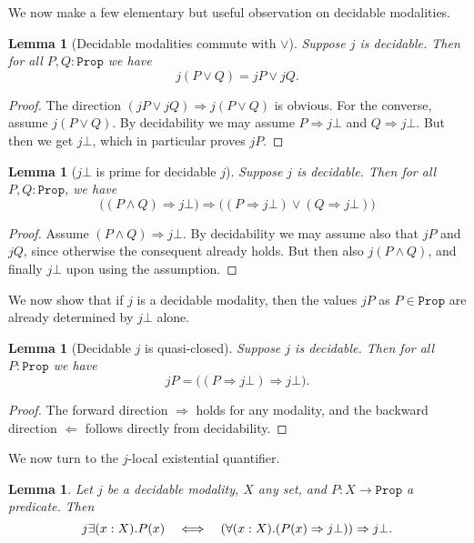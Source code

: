 \documentclass[reqno,11pt]{amsproc}
\theoremstyle{plain}
\newtheorem{lemma}[theorem]{Lemma}
\theoremstyle{definition}
\newcommand{\Const}[1]{\mathtt{#1}}
\renewcommand{\to}[1][]{\xrightarrow{#1}}
\newcommand{\prop}{\Const{Prop}}
\newcommand{\imp}{\Rightarrow}
\let\originalleft\left
\let\originalright\right
\renewcommand{\left}{\mathopen{}\mathclose\bgroup\originalleft}
\renewcommand{\right}{\aftergroup\egroup\originalright}
\numberwithin{equation}{section}
\begin{document}
We now make a few elementary but useful observation on decidable modalities.

\begin{lemma}[Decidable modalities commute with $\lor$]
	\label{prop.dec_mod_or}
	Suppose $j$ is decidable. Then for all $P,Q:\prop$ we have
	\[
		j (P \lor Q) = j P \lor j Q.
	\]
\end{lemma}

\begin{proof}
	The direction $(j P \lor j Q)\imp j (P \lor Q)$ is obvious. For the converse, assume $j (P \lor Q)$. By decidability we may assume $P\imp j \bot$ and $Q\imp j \bot$. But then we get $j \bot$, which in particular proves $j P$.
\end{proof}

\begin{lemma}[$j \bot$ is prime for decidable $j$]
Suppose $j$ is decidable. Then for all $P,Q:\prop$, we have
\[\big((P\wedge Q)\imp j \bot\big)\imp\big((P\imp j \bot)\lor(Q\imp j \bot)\big)\]
\end{lemma}

\begin{proof}
Assume $(P\wedge Q)\imp j \bot$. By decidability we may assume also that $j P$ and $j Q$, since otherwise the consequent already holds. But then also $j (P\wedge Q)$, and finally $j \bot$ upon using the assumption.
\end{proof}

We now show that if $j$ is a decidable modality, then the values $jP$ as $P \in \prop$ are already determined by $j\bot$ alone.

\begin{lemma}[Decidable $j$ is quasi-closed]
	Suppose $j$ is decidable. Then for all $P:\prop$ we have
	\[
		j P=\big((P\imp j\bot)\imp j\bot\big).
	\]
\end{lemma}

\begin{proof}
	The forward direction $\Rightarrow$ holds for any modality, and the backward direction $\Leftarrow$ follows directly from decidability.
\end{proof}

We now turn to the $j$-local existential quantifier.

\begin{lemma}
	Let $j$ be a decidable modality, $X$ any set, and $P : X \to \prop$ a predicate. Then
	\[
		j \exists (x : X) . P(x) \quad \Longleftrightarrow \quad \left( \forall (x : X). (P(x) \imp j \bot) \right) \imp j \bot.
	\]
\end{lemma}
\end{document}
